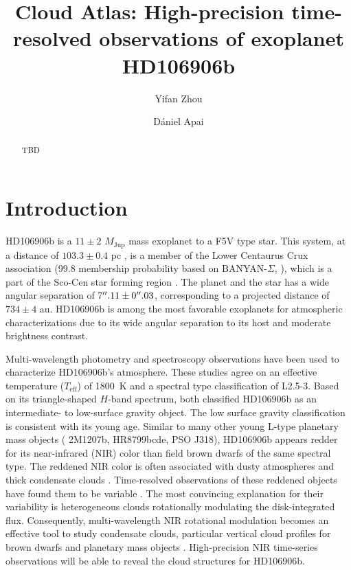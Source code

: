 \documentclass[twocolumn]{aastex62}
\newcommand{\mjup}{\ensuremath{M_\mathrm{Jup}}\xspace}
\newcommand{\teff}{\ensuremath{T_{\mathrm{eff}}}\xspace}
\begin{document}
\title{Cloud Atlas: High-precision time-resolved observations of exoplanet HD106906b}


\author{Yifan Zhou}

\author{D\'aniel Apai}

\begin{abstract}
TBD
\end{abstract}

\keywords{}

\section{Introduction}

HD106906b is a $11\pm2$ \mjup  mass exoplanet \citep{Bailey2013} to a F5V type star. This system, at a distance of $103.3\pm0.4$ pc \citep{Gaia2016,Gaia2018}, is a member of the Lower Centaurus Crux association (99.8 membership probability based on BANYAN-$\Sigma$, \citealt{Gagne2018} ), which is a part of the Sco-Cen star forming region \citep[age: $15\pm3$ Myr][]{Pecaut2016}. The planet and the star has a wide angular separation of $7\mbox{$^{\prime\prime}$}.11\pm0\mbox{$^{\prime\prime}$}.03$\citep{Bailey2013}, corresponding to a projected distance of $734\pm4$ au.  HD106906b is among the most favorable exoplanets for atmospheric characterizations \citep[e.g., ]{Bailey2013,Kalas2015,Wu2016,Daemgen2017} due to its wide angular separation to its host and moderate brightness contrast.

Multi-wavelength photometry \citep{Bailey2013,Kalas2015,Wu2016} and spectroscopy \citep{Bailey2013, Daemgen2017} observations have been used to characterize HD106906b's atmosphere.  These studies agree on an effective temperature (\teff) of 1800~K and a spectral type classification of L2.5-3. Based on its triangle-shaped $H$-band spectrum, both \citet{Bailey2013, Daemgen2017} classified HD106906b as an intermediate- to low-surface gravity object. The low surface gravity classification is consistent with its young age. Similar to many other young L-type planetary mass objects ( 2M1207b, HR8799bcde, PSO J318), HD106906b appears redder for its near-infrared (NIR) color than field brown dwarfs of the same spectral type. The reddened NIR color is often associated with dusty atmospheres and thick condensate clouds \citep[e.g.,][]{Skemer2011}. Time-resolved observations of these reddened objects have found them to be variable \citep[e.g.,][]{Biller2015,Zhou2016,Lew2016,Vos2017,Biller2017,Manjavacas2017,Zhou2019}. The most convincing explanation for their variability is heterogeneous clouds rotationally modulating the disk-integrated flux. Consequently, multi-wavelength NIR rotational modulation becomes an effective tool to  study condensate clouds, particular vertical cloud profiles for brown dwarfs and planetary mass objects \cite{Apai2013, Biller2017, Zhou2018}. High-precision NIR time-series observations will be able to reveal the cloud structures for HD106906b.
\end{document}
